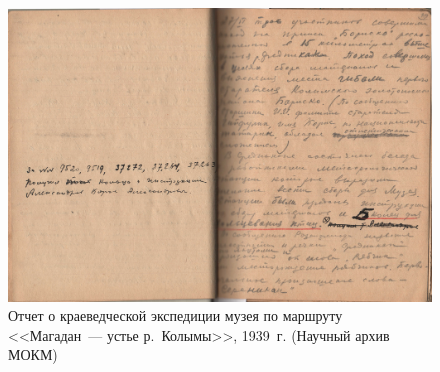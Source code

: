 \begin{figure}[h!]
  \begin{center}
    \includegraphics[width=1\textwidth]{authors/usupova-fig-2.jpg}
  \end{center}
  \caption{Отчет о краеведческой экспедиции музея по маршруту <<Магадан~--- устье р.~Колымы>>, 1939~г. (Научный архив МОКМ)}
  \label{fig:usupova-fig-2}
\end{figure}
